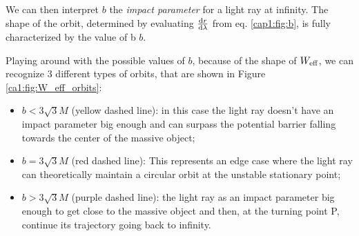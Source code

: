 We can then interpret $b$ the \textit{impact parameter} for a light ray at
infinity.
The shape of the orbit, determined by evaluating $\dv{r}{\lambda}$ from eq.
\ref{cap1:fig:b}, is fully characterized by the value of b $b$.

Playing around with the possible values of $b$, because of the shape of
$W_{\rm eff}$, we can recognize 3 different types of orbits, that are shown in
Figure \ref{ca1:fig:W_eff_orbits}:

\begin{itemize}
    \item $b < 3 \sqrt{3} M$ (yellow dashed line): in this case the light ray doesn't
        have an impact parameter big enough and can surpass the potential
        barrier falling towards the center of the massive object;
    \item $b = 3 \sqrt{3} M$ (red dashed line): This represents an edge case where the
        light ray can theoretically maintain a circular orbit at the unstable
        stationary point;
    \item $b > 3 \sqrt{3} M$ (purple dashed line): the light ray as an impact
        parameter big enough to get close to the massive object and then, at the
        turning point P, continue its trajectory going back to infinity.
\end{itemize}


